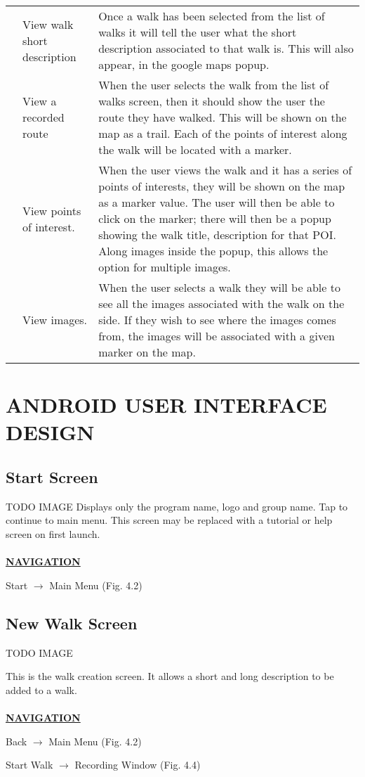 \documentclass[12pt]{article}
\begin{document}
\begin{longtable}{|p{2cm}|p{3cm}|p{10cm}|}
\\\cline{2-3} & \multicolumn{1}{|p{3cm}|}{View walk short description}& \multicolumn{1}{|p{10cm}|}{Once a walk has been selected from the list of walks it will tell the user what the short description associated to that walk is. This will also appear, in the google maps popup.}
\\\cline{2-3} & \multicolumn{1}{|p{3cm}|}{View a recorded route}& \multicolumn{1}{|p{10cm}|}{When the user selects the walk from the list of walks screen, then it should show the user the route they have walked. This will be shown on the map as a trail. Each of the points of interest along the walk will be located with a marker.}
\\\cline{2-3} & \multicolumn{1}{|p{3cm}|}{View points of interest.}& \multicolumn{1}{|p{10cm}|}{When the user views the walk and it has a series of points of interests, they will be shown on the map as a marker value. The user will then be able to click on the marker; there will then be a popup showing the walk title, description for that POI. Along images inside the popup, this allows the option for multiple images.}
\\\cline{2-3} & \multicolumn{1}{|p{3cm}|}{View images.}& \multicolumn{1}{|p{10cm}|}{When the user selects a walk they will be able to see all the images associated with the walk on the side. If they wish to see where the images comes from, the images will be associated with a given marker on the map.}
\\\hline
\end{longtable}
\newpage
\section{ANDROID USER INTERFACE DESIGN}
\subsection{Start Screen}
\par{TODO IMAGE}
Displays only the program name, logo and group name. Tap to continue to main menu. This screen may be replaced with a tutorial or help screen on first launch. \\\\
\textbf{\uline{NAVIGATION}}
\par{Start $\rightarrow$ Main Menu (Fig. 4.2)} 
\subsection{New Walk Screen}
\par{TODO IMAGE}
\par{This is the walk creation screen. It allows a short and long description to be added to a walk.  \\ \\}
\textbf{\uline{NAVIGATION}}
\par{Back $\rightarrow$ Main Menu (Fig. 4.2)}
\par{Start Walk $\rightarrow$ Recording Window (Fig. 4.4)}
\end{document}
